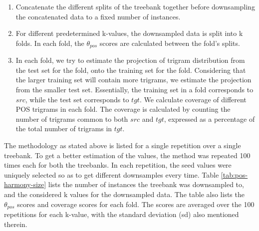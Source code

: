 \begin{enumerate}
    \item Concatenate the different splits of the treebank together before downsampling the concatenated data to a fixed number of instances.
    \item For different predetermined k-values, the downsampled data is split into k folds. In each fold, the $\theta_{pos}$ scores are calculated between the fold's splits.
    \item In each fold, we try to estimate the projection of trigram distribution from the test set for the fold, onto the training set for the fold. Considering that the larger training set will contain more trigrams, we estimate the projection from the smaller test set. Essentially, the training set in a fold corresponds to $src$, while the test set corresponds to $tgt$. We calculate coverage of different POS trigrams in each fold. The coverage is calculated by counting the number of trigrams common to both $src$ and $tgt$, expressed as a percentage of the total number of trigrams in $tgt$.
\end{enumerate}

The methodology as stated above is listed for a single repetition over a single treebank. To get a better estimation of the values, the method was repeated 100 times each for both the treebanks. In each repetition, the seed values were uniquely selected so as to get different downsamples every time. Table \ref{tab:pos-harmony-size} lists the number of instances the treebank was downsampled to, and the considered k values for the downsampled data. The table also lists the $\theta_{pos}$ scores and coverage scores for each fold. The scores are averaged over the 100 repetitions for each k-value, with the standard deviation (sd) also mentioned therein.

